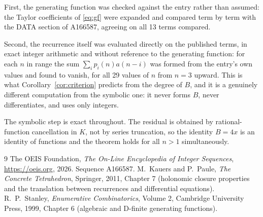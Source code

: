 \documentclass[11pt,a4paper]{article}
\theoremstyle{plain}
\theoremstyle{definition}
\begin{document}
First, the generating function was checked against the entry rather than assumed: the
Taylor coefficients of \eqref{eq:gf} were expanded and compared term by term with the DATA
section of A166587, agreeing on all 13 terms compared.

Second, the recurrence itself was evaluated directly on the published terms, in exact
integer arithmetic and without reference to the generating function: for each $n$ in range
the sum $\sum_{i}p_{i}(n)a(n-i)$ was formed from the entry's own values and found to
vanish, for all 29 values of $n$ from $n=3$ upward. This is what
Corollary~\ref{cor:criterion} predicts from the degree of $B$, and it is a genuinely
different computation from the symbolic one: it never forms $B$, never differentiates, and
uses only integers.

The symbolic step is exact throughout. The residual is obtained by rational-function
cancellation in $K$, not by series truncation, so the identity $B=4 x$ is an
identity of functions and the theorem holds for all $n>1$ simultaneously.

\begin{thebibliography}{9}
 The OEIS Foundation, \emph{The On-Line Encyclopedia of Integer Sequences},
\url{https://oeis.org}, 2026. Sequence A166587.
 M.~Kauers and P.~Paule, \emph{The Concrete Tetrahedron}, Springer, 2011,
Chapter 7 (holonomic closure properties and the translation between recurrences and
differential equations).
 R.~P.~Stanley, \emph{Enumerative Combinatorics}, Volume 2, Cambridge
University Press, 1999, Chapter 6 (algebraic and D-finite generating functions).
\end{thebibliography}
\end{document}
